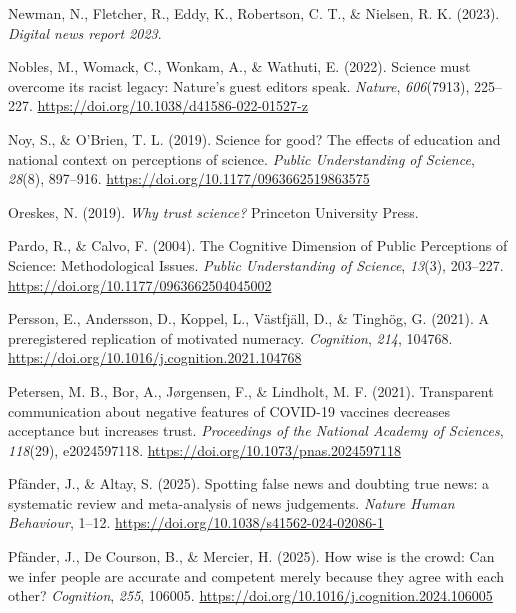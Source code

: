 \documentclass[
  jou,
  floatsintext,
  longtable,
  nolmodern,
  notxfonts,
  notimes,
  colorlinks=true,linkcolor=blue,citecolor=blue,urlcolor=blue]{apa7}
\newlength{\cslhangindent}
\newenvironment{CSLReferences}[2] %
 {\begin{list}{}{%
  \setlength{\itemindent}{0pt}
  \setlength{\leftmargin}{0pt}
  \setlength{\parsep}{0pt}
  \ifodd #1
   \setlength{\leftmargin}{\cslhangindent}
   \setlength{\itemindent}{-1\cslhangindent}
  \fi
  \setlength{\itemsep}{#2\baselineskip}}}
 {\end{list}}
\begin{document}
\begin{CSLReferences}{1}{0}
Newman, N., Fletcher, R., Eddy, K., Robertson, C. T., \& Nielsen, R. K.
(2023). \emph{Digital news report 2023}.

Nobles, M., Womack, C., Wonkam, A., \& Wathuti, E. (2022). Science must
overcome its racist legacy: Nature{'}s guest editors speak.
\emph{Nature}, \emph{606}(7913), 225--227.
\url{https://doi.org/10.1038/d41586-022-01527-z}

Noy, S., \& O'Brien, T. L. (2019). Science for good? The effects of
education and national context on perceptions of science. \emph{Public
Understanding of Science}, \emph{28}(8), 897--916.
\url{https://doi.org/10.1177/0963662519863575}

Oreskes, N. (2019). \emph{Why trust science?} Princeton University
Press.

Pardo, R., \& Calvo, F. (2004). The Cognitive Dimension of Public
Perceptions of Science: Methodological Issues. \emph{Public
Understanding of Science}, \emph{13}(3), 203--227.
\url{https://doi.org/10.1177/0963662504045002}

Persson, E., Andersson, D., Koppel, L., Västfjäll, D., \& Tinghög, G.
(2021). A preregistered replication of motivated numeracy.
\emph{Cognition}, \emph{214}, 104768.
\url{https://doi.org/10.1016/j.cognition.2021.104768}

Petersen, M. B., Bor, A., Jørgensen, F., \& Lindholt, M. F. (2021).
Transparent communication about negative features of COVID-19 vaccines
decreases acceptance but increases trust. \emph{Proceedings of the
National Academy of Sciences}, \emph{118}(29), e2024597118.
\url{https://doi.org/10.1073/pnas.2024597118}

Pfänder, J., \& Altay, S. (2025). Spotting false news and doubting true
news: a systematic review and meta-analysis of news judgements.
\emph{Nature Human Behaviour}, 1--12.
\url{https://doi.org/10.1038/s41562-024-02086-1}

Pfänder, J., De Courson, B., \& Mercier, H. (2025). How wise is the
crowd: Can we infer people are accurate and competent merely because
they agree with each other? \emph{Cognition}, \emph{255}, 106005.
\url{https://doi.org/10.1016/j.cognition.2024.106005}


\end{CSLReferences}
\end{document}
